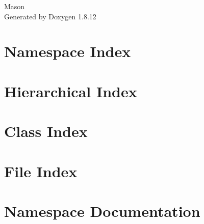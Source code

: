 \documentclass[twoside]{book}
\newcommand{\+}{\discretionary{\mbox{\scriptsize$\hookleftarrow$}}{}{}}
\newcommand{\clearemptydoublepage}{%
  \newpage{\pagestyle{empty}\cleardoublepage}%
}
\begin{document}
\hypersetup{pageanchor=false,
             bookmarksnumbered=true,
             pdfencoding=unicode
            }
\begin{titlepage}
\vspace*{7cm}
\begin{center}%
{\Large Mason }\\
\vspace*{1cm}
{\large Generated by Doxygen 1.8.12}\\
\end{center}
\end{titlepage}
\clearemptydoublepage
{}
\tableofcontents
\clearemptydoublepage
{}
\hypersetup{pageanchor=true}

\chapter{Namespace Index}

\chapter{Hierarchical Index}

\chapter{Class Index}

\chapter{File Index}

\chapter{Namespace Documentation}



\end{document}
